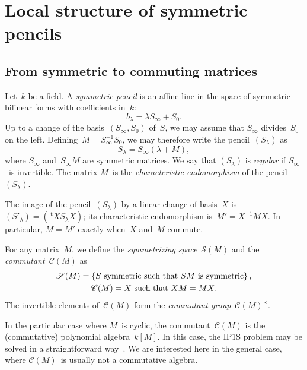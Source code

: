 \documentclass{article}%
\let\ro\mathscr
\def\transpose{\,{}^{\mathrm{t}\!}}
\def\acco#1{\left\{#1\right\}}
\begin{document}
\section{Local structure of symmetric pencils}%
\subsection{From symmetric to commuting matrices}%

Let~$k$ be a field. A \emph{symmetric pencil} is an affine line in the
space of symmetric bilinear forms with coefficients in~$k$:
\begin{equation}
b_{λ} = λ S_{∞} + S_0.
\end{equation}
Up to a change of the basis~$(S_{∞}, S_{0})$ of~$S$, we may assume that
$S_{∞}$ divides~$S_0$ on the left. Defining~$M = S_{∞}^{-1} S_0^{}$, we
may therefore write the pencil~$(S_{λ})$ as
\begin{equation}
S_{λ} = S_{∞} (λ + M),
\end{equation}
where $S_{∞}$ and~$S_{∞} M$ are symmetric matrices. We say that $(S_{λ})$
is \emph{regular} if $S_{∞}$~is invertible. The matrix $M$~is the
\emph{characteristic endomorphism} of the pencil~$(S_{λ})$.

The image of the pencil~$(S_{λ})$ by a linear change of basis~$X$
is~$(S'_{λ}) = (\transpose{X} S_{λ} X)$; its characteristic endomorphism
is~$M' = X^{-1} M X$. In particular, $M = M'$ exactly when~$X$ and~$M$
commute.


For any matrix~$M$, we define the \emph{symmetrizing space}~$\ro S(M)$
and the \emph{commutant}~$\ro C(M)$ as
\begin{gather}
\ro S(M) = \acco{\text{$S$ symmetric such that $SM$~is symmetric} },\\
\ro C(M) = \text{\text{$X$ such that~$XM = MX$}}.
\end{gather}
The invertible elements of~$\ro C(M)$ form the \emph{commutant
group}~$\ro C(M)^{×}$.

In the particular case where $M$~is cyclic, the commutant~$\ro C(M)$ is
the (commutative) polynomial algebra~$k[M]$. In this case, the IP1S
problem may be solved in a straightforward way~\cite{MPG2013}. We are
interested here in the general case, where $\ro C(M)$~is usually not a
commutative algebra.
\end{document}

